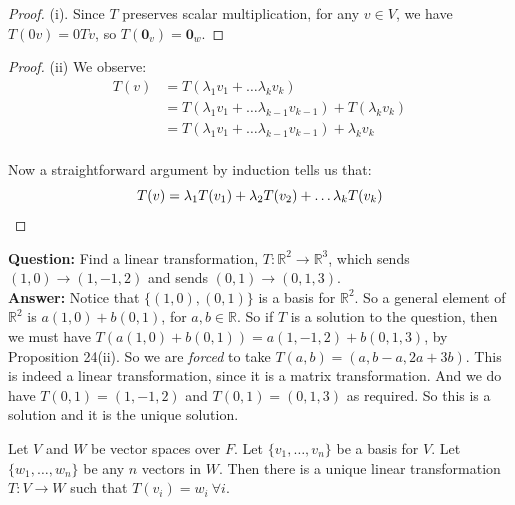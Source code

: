 \documentclass[10pt]{scrartcl}
\begin{document}
\begin{proof} (i). Since $T$ preserves scalar multiplication, for any $v \in V$, we have $T(0v) = 0Tv$, so $T(\mathbf{0}_v) = \mathbf{0}_w$.
\end{proof}


\begin{proof} 
(ii)
We observe:
\[
\begin{aligned}
T(v) &= T(\lambda_1v_1 + \dots \lambda_kv_k)\\
&= T(\lambda_1v_1 + \dots \lambda_{k-1}v_{k-1}) + T(\lambda_kv_k)\\
&= T(\lambda_1v_1 + \dots \lambda_{k-1}v_{k-1}) + \lambda_kv_k\\
\end{aligned}\]

Now a straightforward argument by induction tells us that: \[T(v) = \lambda_1T(v_1) + \lambda_2T(v_2) + \dots \lambda_kT(v_k) \qedhere\]
\end{proof}

\begin{example} \textbf{Question:} Find a linear transformation, $T: \mathbb{R}^2 \to \mathbb{R}^3$, which sends $(1,0) \to (1,-1,2)$ and sends $(0,1) \to (0,1,3)$.\\

\textbf{Answer:} Notice that $\{(1,0), (0,1)\}$ is a basis for $\mathbb{R}^2$. So a general element of $\mathbb{R}^2$ is $a(1,0) + b(0,1)$, for $a,b \in \mathbb{R}$. So if $T$ is a solution to the question, then we must have $T(a(1,0) + b(0,1)) = a(1,-1,2) + b(0,1,3)$, by Proposition 24(ii).  So we are \emph{forced} to take $T(a,b) = (a,b-a,2a+3b)$. This is indeed a linear transformation, since it is a matrix transformation. And we do have $T(0,1) = (1,-1,2)$ and $T(0,1) = (0,1,3)$ as required. So this is a solution and it is the unique solution.
\end{example}\vspace*{5pt}


\begin{proposition}Let $V$ and $W$ be vector spaces over $F$. Let $\{v_1,\dots,v_n\}$ be a basis for $V$. Let $\{w_1,\dots,w_n\}$ be any $n$ vectors in $W$. Then there is a unique linear transformation $T: V \to W$ such that $T(v_i) = w_i ~\forall i$.	
\end{proposition}\vspace*{5pt}
\end{document}
